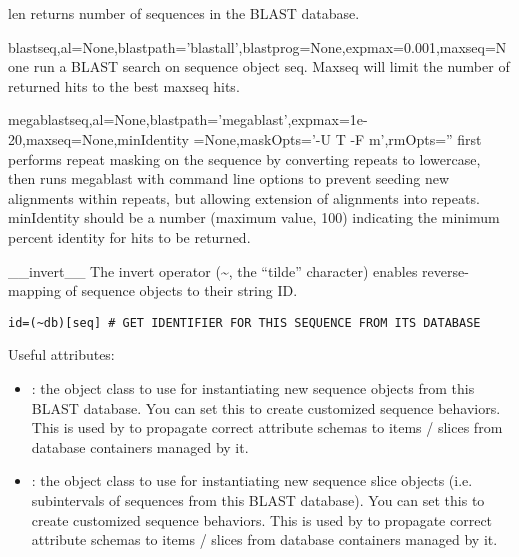 \documentclass{howto}
\begin{document}
\begin{funcdesc}{len}{}
  returns number of sequences in the BLAST database.
\end{funcdesc}

\begin{funcdesc}{blast}{seq,al=None,blastpath='blastall',blastprog=None,expmax=0.001,maxseq=None}
  run a BLAST search on sequence object seq.  Maxseq will limit the number of returned hits to the best maxseq hits. 
\end{funcdesc}

\begin{funcdesc}{megablast}{seq,al=None,blastpath='megablast',expmax=1e-20,maxseq=None,minIdentity
=None,maskOpts='-U T -F m',rmOpts=''}
  first performs repeat masking on the sequence by converting repeats to lowercase,
  then runs megablast with command line options to prevent seeding new alignments
  within repeats, but allowing extension 
  of alignments into repeats.  minIdentity should be a number (maximum value, 100)
  indicating the minimum percent identity for hits to be returned.
\end{funcdesc}

\begin{funcdesc}{__invert__}{}
  The invert operator (\textasciitilde, the ``tilde'' character) 
  enables reverse-mapping of sequence objects to their string ID.
\begin{verbatim}
id=(~db)[seq] # GET IDENTIFIER FOR THIS SEQUENCE FROM ITS DATABASE
\end{verbatim}
\end{funcdesc}


Useful attributes:
\begin{itemize}

\item
{}: the object class to use for instantiating new sequence objects from this BLAST database.  You can set this to create customized sequence behaviors.  
This is used by  to propagate correct attribute schemas to
items / slices from database containers managed by it.

\item
{}: the object class to use for instantiating new sequence slice objects (i.e. subintervals of sequences from this BLAST database).  You can set this to create customized sequence behaviors.
This is used by  to propagate correct attribute schemas to
items / slices from database containers managed by it.

\end{itemize}
\end{document}
